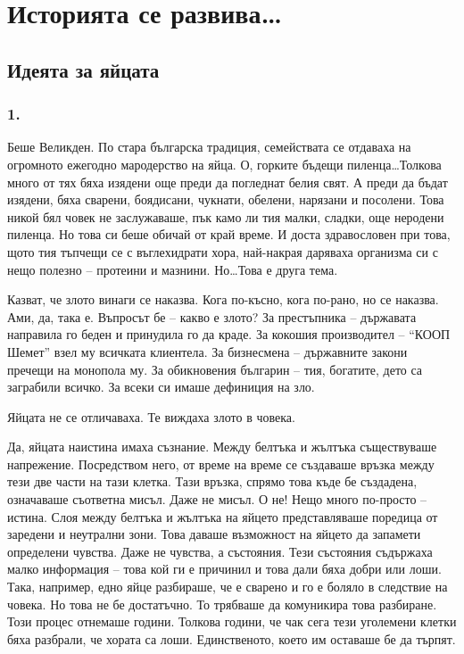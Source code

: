 \documentclass[ebook,openany,12pt]{memoir}
\begin{document}
\part{Историята се развива\ldots}

\chapter{Идеята за яйцата}

\section*{1.}

Беше Великден. По стара българска традиция, семействата се отдаваха на огромното ежегодно мародерство на яйца. О, горките бъдещи пиленца\ldots Толкова много от тях бяха изядени още преди да погледнат белия свят. А преди да бъдат изядени, бяха сварени, боядисани, чукнати, обелени, нарязани и посолени. Това никой бял човек не заслужаваше, пък камо ли тия малки, сладки, още неродени пиленца. Но това си беше обичай от край време. И доста здравословен при това, щото тия тъпчещи се с въглехидрати хора, най-накрая даряваха организма си с нещо полезно – протеини и мазнини. Но\ldots Това е друга тема.

Казват, че злото винаги се наказва. Кога по-късно, кога по-рано, но се наказва. Ами, да, така е. Въпросът бе – какво е злото? За престъпника – държавата направила го беден и принудила го да краде. За кокошия производител – ``КООП Шемет'' взел му всичката клиентела. За бизнесмена – държавните закони пречещи на монопола му. За обикновения българин – тия, богатите, дето са заграбили всичко. За всеки си имаше дефиниция на зло. 

Яйцата не се отличаваха. Те виждаха злото в човека. 

Да, яйцата наистина имаха съзнание. Между белтъка и жълтъка съществуваше напрежение. Посредством него, от време на време се създаваше връзка между тези две части на тази клетка. Тази връзка, спрямо това къде бе създадена, означаваше съответна мисъл. Даже не мисъл. О не! Нещо много по-просто – истина. Слоя между белтъка и жълтъка на яйцето представляваше поредица от заредени и неутрални зони. Това даваше възможност на яйцето да запамети определени чувства. Даже не чувства, а състояния. Тези състояния съдържаха малко информация – това кой ги е причинил и това дали бяха добри или лоши. Така, например, едно яйце разбираше, че е сварено и го е боляло в следствие на човека. Но това не бе достатъчно. То трябваше да комуникира това разбиране. Този процес отнемаше години. Толкова години, че чак сега тези уголемени клетки бяха разбрали, че хората са лоши. Единственото, което им оставаше бе да търпят.
\end{document}
